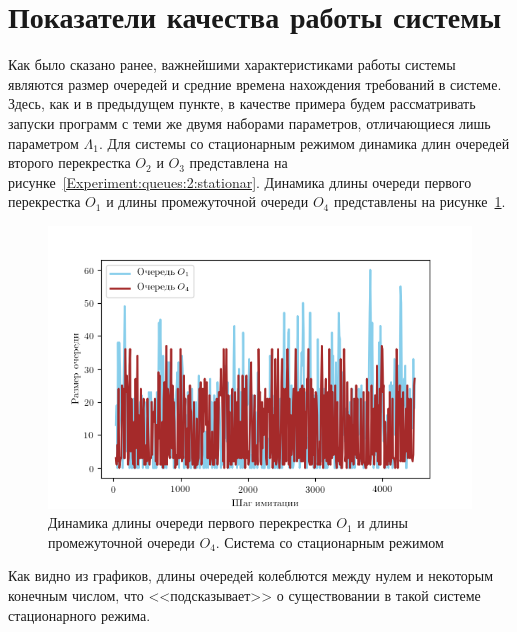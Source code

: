 \section{Показатели качества работы системы}
Как было сказано ранее, важнейшими характеристиками работы системы являются размер очередей и средние времена нахождения требований в системе. Здесь, как и в предыдущем пункте, в качестве примера будем рассматривать запуски программ с теми же двумя наборами параметров, отличающиеся лишь параметром $\Lambda_1$. Для системы со стационарным режимом динамика длин очередей второго перекрестка $O_2$ и $O_3$ представлена на рисунке~\ref{Experiment:queues:2:stationar}. Динамика длины очереди первого перекрестка $O_1$ и длины промежуточной очереди $O_4$ представлены на рисунке~\ref{Experiment:queues:1:stationar}.

\begin{figure}[h]
\centering
\includegraphics[scale=1]{Dissertation/Work_structured/Pictures/pic_queues_1_stationar.png}
\caption{Динамика длины очереди первого перекрестка $O_1$ и длины промежуточной очереди $O_4$. Система со стационарным режимом}
\label{Experiment:queues:1:stationar}
\end{figure}
Как видно из графиков, длины очередей колеблются между нулем и некоторым конечным числом, что <<подсказывает>> о существовании в такой системе стационарного режима.


